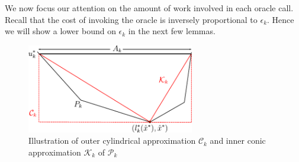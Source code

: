 We now focus our attention on the amount of work involved in each
oracle call. Recall that the cost of invoking the oracle is inversely
proportional to $\epsilon_k$. Hence we will show a lower bound on $\epsilon_k$
in the next few lemmas.


\begin{figure}
\begin{centering}
\includegraphics[width=0.65\textwidth]{cutting/fig6.pdf}
\par\end{centering}
\caption{Illustration of outer cylindrical approximation $\mathcal{C}_k$ and inner conic approximation $\mathcal{K}_k$ of $\mathcal{P}_k$} \label{fig:outer-inner-approx}
\end{figure} 

